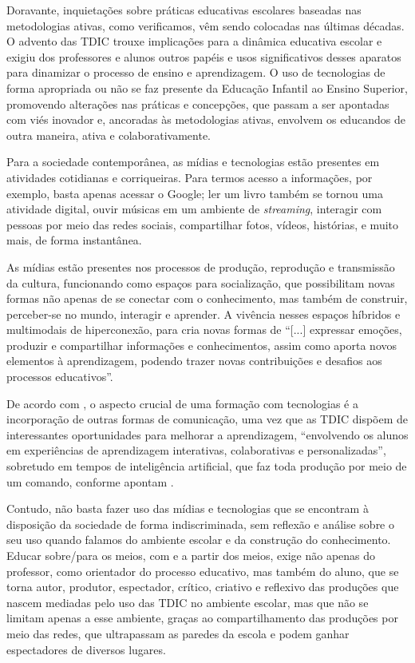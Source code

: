 \documentclass[portuguese]{textolivre}
\begin{document}
Doravante, inquietações sobre práticas educativas escolares baseadas nas metodologias ativas, como verificamos, vêm sendo colocadas nas últimas décadas. O advento das TDIC trouxe implicações para a dinâmica educativa escolar e exigiu dos professores e alunos outros papéis e usos significativos desses aparatos para dinamizar o processo de ensino e aprendizagem. O uso de tecnologias de forma apropriada ou não se faz presente da Educação Infantil ao Ensino Superior, promovendo alterações nas práticas e concepções, que passam a ser apontadas com viés inovador e, ancoradas às metodologias ativas, envolvem os educandos de outra maneira, ativa e colaborativamente.

Para a sociedade contemporânea, as mídias e tecnologias estão presentes em atividades cotidianas e corriqueiras. Para termos acesso a informações, por exemplo, basta apenas acessar o Google; ler um livro também se tornou uma atividade digital, ouvir músicas em um ambiente de \textit{streaming}, interagir com pessoas por meio das redes sociais, compartilhar fotos, vídeos, histórias, e muito mais, de forma instantânea.

As mídias estão presentes nos processos de produção, reprodução e transmissão da cultura, funcionando como espaços para socialização, que possibilitam novas formas não apenas de se conectar com o conhecimento, mas também de construir, perceber-se no mundo, interagir e aprender. A vivência nesses espaços híbridos e multimodais de hiperconexão, para \textcite[p.~458]{valente2017metodologias} cria novas formas de “[...] expressar emoções, produzir e compartilhar informações e conhecimentos, assim como aporta novos elementos à aprendizagem, podendo trazer novas contribuições e desafios aos processos educativos”.

De acordo com \textcite[p.~8]{pasinato2023educacao}, o aspecto crucial de uma formação com tecnologias é a incorporação de outras formas de comunicação, uma vez que as TDIC dispõem de interessantes oportunidades para melhorar a aprendizagem, “envolvendo os alunos em experiências de aprendizagem interativas, colaborativas e personalizadas”, sobretudo em tempos de inteligência artificial, que faz toda produção por meio de um comando, conforme apontam \textcite{rodrigues2023para}.

Contudo, não basta fazer uso das mídias e tecnologias que se encontram à disposição da sociedade de forma indiscriminada, sem reflexão e análise sobre o seu uso quando falamos do ambiente escolar e da construção do conhecimento. Educar sobre/para os meios, com e a partir dos meios, exige não apenas do professor, como orientador do processo educativo, mas também do aluno, que se torna autor, produtor, espectador, crítico, criativo e reflexivo das produções que nascem mediadas pelo uso das TDIC no ambiente escolar, mas que não se limitam apenas a esse ambiente, graças ao compartilhamento das produções por meio das redes, que ultrapassam as paredes da escola e podem ganhar espectadores de diversos lugares.
\end{document}
